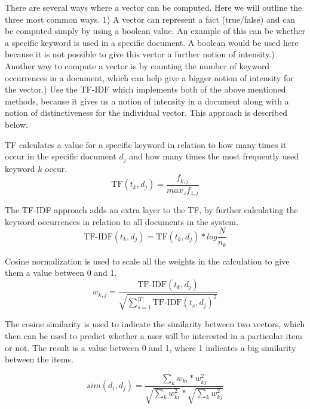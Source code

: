 There are several ways where a vector can be computed. Here we will outline the three most common ways.
1) A vector can represent a fact (true/false) and can be computed simply by using a boolean value. An example of this can be whether a specific keyword is used in a specific document. A boolean would be used here because it is not possible to give this vector a further notion of intensity.) Another way to compute a vector is by counting the number of keyword occurrences in a document, which can help give a bigger notion of intensity for the vector.) Use the TF-IDF which implements both of the above mentioned methods, because it gives us a notion of intensity in a document along with a notion of distinctiveness for the individual vector. This approach is described below.\newline

TF calculates a value for a specific keyword in relation to how many times it occur in the specific document \(d_{j}\) and how many times the most frequently used keyword \(k\) occur.
\[
	\text{TF}(t_{k},d_{j}) = \frac{f_{k,j}}{max_{z}f_{z,j}}
\]

The TF-IDF approach adds an extra layer to the TF, by further calculating the keyword occurrences in relation to all documents in the system.
\[
	\text{TF-IDF}(t_{k},d_{j}) = \text{TF}(t_{k},d_{j}) * log{\frac{N}{n_{k}}}
\]

Cosine normalization is used to scale all the weights in the calculation to give them a value between 0 and 1.
\[
	w_{k,j} = \frac{\text{TF-IDF}(t_{k},d_{j})}{\sqrt{\sum_{s=1}^{|T|} \text{TF-IDF}(t_{s}, d_{j})^2}}
\]

The cosine similarity is used to indicate the similarity between two vectors, which then can be used to predict whether a user will be interested in a particular item or not. The result is a value between 0 and 1, where 1 indicates a big similarity between the items.

\[
	sim({d_{i},d_{j}}) = \frac{\sum_{k}w_{ki}*w_{kj}^2}{\sqrt{\sum_{k}w_{ki}^2}*\sqrt{\sum_{k}w_{kj}^2}}
\]


